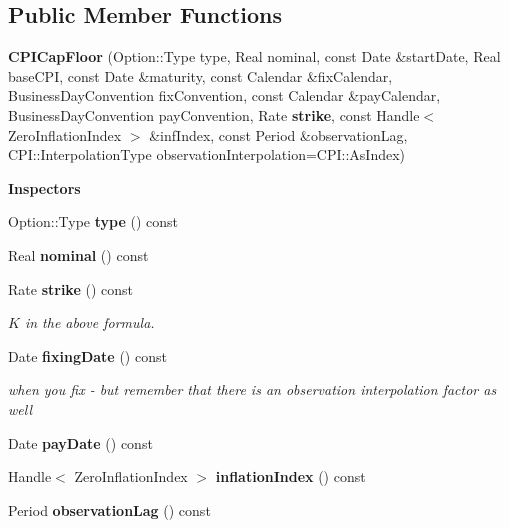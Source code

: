\subsection*{Public Member Functions}
\begin{DoxyCompactItemize}
\item 
{\bfseries C\+P\+I\+Cap\+Floor} (Option\+::\+Type type, Real nominal, const Date \&start\+Date, Real base\+C\+PI, const Date \&maturity, const Calendar \&fix\+Calendar, Business\+Day\+Convention fix\+Convention, const Calendar \&pay\+Calendar, Business\+Day\+Convention pay\+Convention, Rate {\bf strike}, const Handle$<$ Zero\+Inflation\+Index $>$ \&inf\+Index, const Period \&observation\+Lag, C\+P\+I\+::\+Interpolation\+Type observation\+Interpolation=C\+P\+I\+::\+As\+Index)\label{class_quant_lib_1_1_c_p_i_cap_floor_a7cc708f30c4ea59a2073cc3ba40f9ed2}

\end{DoxyCompactItemize}
\begin{Indent}{\bf Inspectors}\par
\begin{DoxyCompactItemize}
\item 
Option\+::\+Type {\bfseries type} () const \label{class_quant_lib_1_1_c_p_i_cap_floor_aa751ab9af4b974e79e3ee3af2622a893}

\item 
Real {\bfseries nominal} () const \label{class_quant_lib_1_1_c_p_i_cap_floor_a7ea95d50ae601f5bf3e05b915f6fd3f3}

\item 
Rate {\bf strike} () const \label{class_quant_lib_1_1_c_p_i_cap_floor_a32de6512745d4af8bd50b0944c1c143a}

\begin{DoxyCompactList}\small\item\em $ K $ in the above formula. \end{DoxyCompactList}\item 
Date {\bf fixing\+Date} () const \label{class_quant_lib_1_1_c_p_i_cap_floor_afaf0c7ab7f6663eedcf25abaedd1c824}

\begin{DoxyCompactList}\small\item\em when you fix -\/ but remember that there is an observation interpolation factor as well \end{DoxyCompactList}\item 
Date {\bfseries pay\+Date} () const \label{class_quant_lib_1_1_c_p_i_cap_floor_aab6ec074030a6631f7c2d2cf20b62ed9}

\item 
Handle$<$ Zero\+Inflation\+Index $>$ {\bfseries inflation\+Index} () const \label{class_quant_lib_1_1_c_p_i_cap_floor_a02f9efb999d80dc36481bd0dbc2f7da0}

\item 
Period {\bfseries observation\+Lag} () const \label{class_quant_lib_1_1_c_p_i_cap_floor_abbbd05828b9ebdbbc26c5dea8a53b8db}

\end{DoxyCompactItemize}
\end{Indent}
